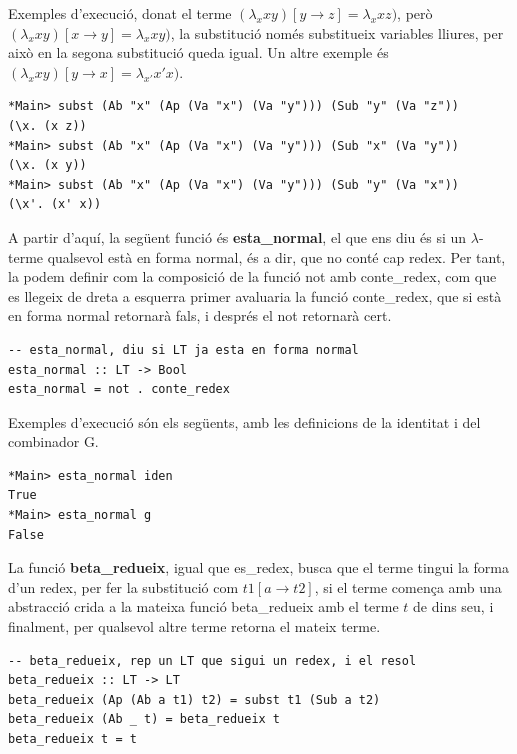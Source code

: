 \documentclass[10pt,a4paper]{article}
\begin{document}
Exemples d'execució, donat el terme $(\lambda_x x y) [y \rightarrow z] = \lambda_x x z)$, però $(\lambda_x x y) [x \rightarrow y] = \lambda_x x y)$, la substitució només substitueix variables lliures, per això en la segona substitució queda igual. Un altre exemple és $(\lambda_x x y) [y \rightarrow x] = \lambda_{x'} {x'} x)$.

\lstset{language=Haskell, breaklines=true, basicstyle=\footnotesize}
\begin{lstlisting}[frame=mystyle]
*Main> subst (Ab "x" (Ap (Va "x") (Va "y"))) (Sub "y" (Va "z"))
(\x. (x z))
*Main> subst (Ab "x" (Ap (Va "x") (Va "y"))) (Sub "x" (Va "y"))
(\x. (x y))
*Main> subst (Ab "x" (Ap (Va "x") (Va "y"))) (Sub "y" (Va "x"))
(\x'. (x' x))
\end{lstlisting}

A partir d'aquí, la següent funció és \textbf{esta\_normal}, el que ens diu és si un $\lambda$-terme qualsevol està en forma normal, és a dir, que no conté cap redex. Per tant, la podem definir com la composició de la funció not amb conte\_redex, com que es llegeix de dreta a esquerra primer avaluaria la funció conte\_redex, que si està en forma normal retornarà fals, i després el not retornarà cert.

\lstset{language=Haskell, breaklines=true, basicstyle=\footnotesize}
\begin{lstlisting}[frame=mystyle]
-- esta_normal, diu si LT ja esta en forma normal
esta_normal :: LT -> Bool
esta_normal = not . conte_redex
\end{lstlisting}

Exemples d'execució són els següents, amb les definicions de la identitat i del combinador G.

\lstset{language=Haskell, breaklines=true, basicstyle=\footnotesize}
\begin{lstlisting}[frame=mystyle]
*Main> esta_normal iden
True
*Main> esta_normal g
False
\end{lstlisting}

\clearpage

La funció \textbf{beta\_redueix}, igual que es\_redex, busca que el terme tingui la forma d'un redex, per fer la substitució com $t1 [a \rightarrow t2]$, si el terme comença amb una abstracció crida a la mateixa funció beta\_redueix amb el terme $t$ de dins seu, i finalment, per qualsevol altre terme retorna el mateix terme.

\lstset{language=Haskell, breaklines=true, basicstyle=\footnotesize}
\begin{lstlisting}[frame=mystyle]
-- beta_redueix, rep un LT que sigui un redex, i el resol
beta_redueix :: LT -> LT
beta_redueix (Ap (Ab a t1) t2) = subst t1 (Sub a t2)
beta_redueix (Ab _ t) = beta_redueix t
beta_redueix t = t
\end{lstlisting}
\end{document}
